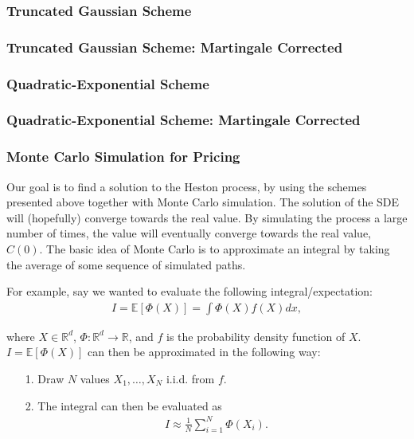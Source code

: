 \documentclass[11pt]{article}
\numberwithin{equation}{section}
\begin{document}
\subsubsection{Truncated Gaussian Scheme}

\subsubsection{Truncated Gaussian Scheme: Martingale Corrected}
\subsubsection{Quadratic-Exponential Scheme}
\subsubsection{Quadratic-Exponential Scheme: Martingale Corrected}
\newpage
\subsubsection{Monte Carlo Simulation for Pricing}
Our goal is to find a solution to the Heston process, by using the schemes
presented above together with Monte Carlo simulation. The solution of the SDE
will (hopefully) converge towards the real value. By simulating the process a
large number of times, the value will eventually converge towards the real
value, $C(0)$. The basic idea of Monte Carlo is to approximate an integral by
taking the average of some sequence of simulated paths.

For example, say we wanted to evaluate the following integral/expectation:
\begin{align*}
I = \mathbb{E}[\Phi(X)] = \int \Phi(X) f(X)  dx,
\end{align*}

where $X \in \mathbb{R}^d$, $\Phi : \mathbb{R}^d \to \mathbb{R}$, and $f$ is the probability density function of $X$. $I = \mathbb{E}[\Phi(X)]$ can then be approximated in the following way:

\begin{itemize}
    \item[1. ] Draw $N$ values $X_1, \ldots, X_N$ i.i.d. from $f$.
    \item[2. ] The integral can then be evaluated as
 \begin{align*}
        I \approx \frac{1}{N} \sum_{i=1}^{N} \Phi(X_i).
        \end{align*}
\end{itemize}
\end{document}
